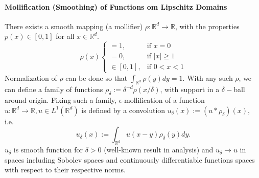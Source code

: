 \documentclass[reqno,9pt]{amsart}
\theoremstyle{plain}
\newtheorem{lem}{Lemma}
\theoremstyle{definition}
\newcommand{\bb}[1]{\mathbb{#1}}
\begin{document}
\paragraph{\bf Mollification (Smoothing) of Functions om Lipschitz Domains}
There exists a smooth mapping (a mollifier) $\rho : \bb R^d \to \bb R$, with the properties $p(x) \in [0,1]$ for all $x \in \bb R^d$.
$$
\rho(x) \begin{cases}
    =1, &\text{if $x=0$}\\
    =0, &\text{if $|x| \geq 1$}\\
    \in [0,1], &\text{if $0 < x < 1$}
\end{cases}
$$
Normalization of $\rho$ can be done so that $\int_{\bb R^d} \rho(y)dy = 1$. With any such $\rho$, we can define a family of functions $\rho_{\delta} := \delta^{-d}\rho(x/\delta)$, with support in a $\delta-$ball around origin. Fixing such a family, $\epsilon$-mollification of a function $u : \bb R^d \to \bb R, u \in L^1(\bb R^d)$ is defined by a convolution $u_{\delta}(x):= (u*\rho_\delta)(x),$ i.e. 
$$ u_\delta(x) := \int_{\bb R^d} u(x-y)\rho_\delta(y)dy.$$
$u_\delta$ is smooth function for $\delta>0$ (well-known result in analysis) and $u_\delta \to u$ in spaces including Sobolev spaces and continuously differentiable functions spaces with respect to their respective norms.
\end{document}
